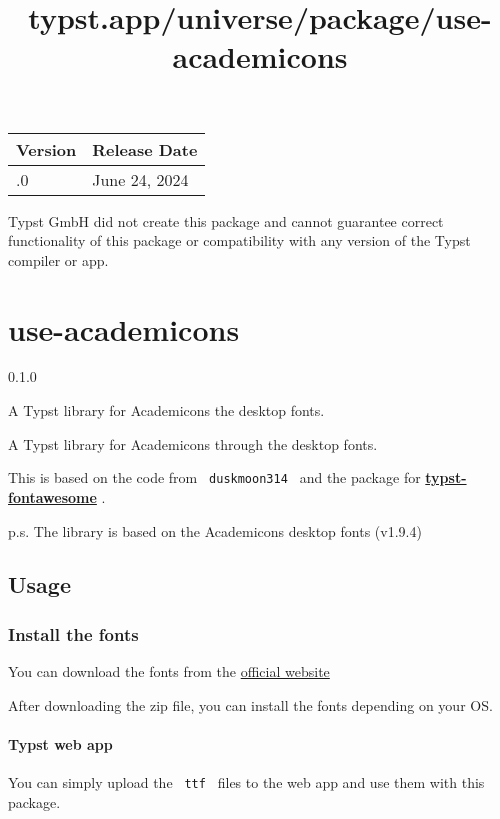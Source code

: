 \begin{longtable}[]{@{}ll@{}}
\toprule\noalign{}
Version & Release Date \\
\midrule\noalign{}
\endhead
\bottomrule\noalign{}
\endlastfoot
0.1.0 & June 24, 2024 \\
\end{longtable}

Typst GmbH did not create this package and cannot guarantee correct
functionality of this package or compatibility with any version of the
Typst compiler or app.


\title{typst.app/universe/package/use-academicons}

\label{banner}
\section{use-academicons}\label{use-academicons}

{ 0.1.0 }

A Typst library for Academicons the desktop fonts.

\label{readme}
A Typst library for Academicons through the desktop fonts.

This is based on the code from \texttt{\ duskmoon314\ } and the package
for
\href{https://github.com/duskmoon314/typst-fontawesome}{\textbf{typst-fontawesome}}
.

p.s. The library is based on the Academicons desktop fonts (v1.9.4)

\subsection{Usage}\label{usage}

\subsubsection{Install the fonts}\label{install-the-fonts}

You can download the fonts from the
\href{https://jpswalsh.github.io/academicons/}{official website}

After downloading the zip file, you can install the fonts depending on
your OS.

\paragraph{Typst web app}\label{typst-web-app}

You can simply upload the \texttt{\ ttf\ } files to the web app and use
them with this package.

